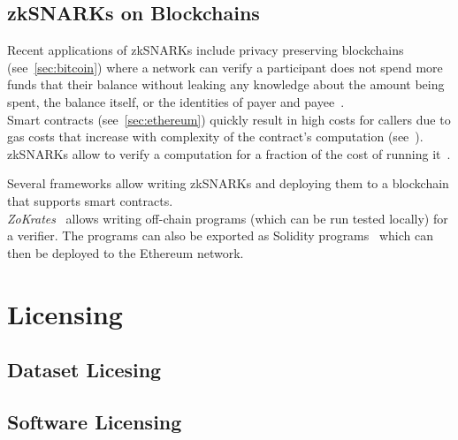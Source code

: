 \subsection{zkSNARKs on Blockchains}\label{subsec:onchain-snarks}

Recent applications of zkSNARKs include privacy preserving blockchains (see~\ref{sec:bitcoin}) where a network can
verify a participant does not spend more funds that their balance without leaking any knowledge about the amount being
spent, the balance itself, or the identities of payer and payee~\cite{zerocash_whitepaper}.\\

Smart contracts (see~\ref{sec:ethereum}) quickly result in high costs for callers due to gas costs that increase with complexity of the
contract's computation (see~).
zkSNARKs allow to verify a computation for a fraction of the cost of running it~\cite{zokrates_intro}.

Several frameworks allow writing zkSNARKs and deploying them to a blockchain that supports smart contracts.\\

\textit{ZoKrates}~\cite{zokrates_repo} allows writing off-chain programs (which can be run tested locally) for a
verifier.
The programs can also be exported as Solidity programs~\cite{solidity_repo} which can then be deployed to the Ethereum
network.



\section{Licensing}

\subsection{Dataset Licesing}

\subsection{Software Licensing}

